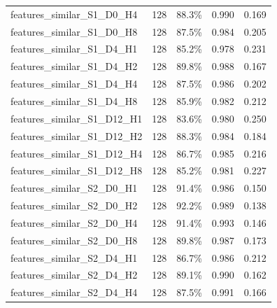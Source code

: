 \documentclass[11pt]{article}
\begin{document}
\begin{longtable}{p{}rrrr}
features\_\allowbreak{}similar\_\allowbreak{}S1\_\allowbreak{}D0\_\allowbreak{}H4 & 128 & 88.3\% & 0.990 & 0.169\\
features\_\allowbreak{}similar\_\allowbreak{}S1\_\allowbreak{}D0\_\allowbreak{}H8 & 128 & 87.5\% & 0.984 & 0.205\\
features\_\allowbreak{}similar\_\allowbreak{}S1\_\allowbreak{}D4\_\allowbreak{}H1 & 128 & 85.2\% & 0.978 & 0.231\\
features\_\allowbreak{}similar\_\allowbreak{}S1\_\allowbreak{}D4\_\allowbreak{}H2 & 128 & 89.8\% & 0.988 & 0.167\\
features\_\allowbreak{}similar\_\allowbreak{}S1\_\allowbreak{}D4\_\allowbreak{}H4 & 128 & 87.5\% & 0.986 & 0.202\\
features\_\allowbreak{}similar\_\allowbreak{}S1\_\allowbreak{}D4\_\allowbreak{}H8 & 128 & 85.9\% & 0.982 & 0.212\\
features\_\allowbreak{}similar\_\allowbreak{}S1\_\allowbreak{}D12\_\allowbreak{}H1 & 128 & 83.6\% & 0.980 & 0.250\\
features\_\allowbreak{}similar\_\allowbreak{}S1\_\allowbreak{}D12\_\allowbreak{}H2 & 128 & 88.3\% & 0.984 & 0.184\\
features\_\allowbreak{}similar\_\allowbreak{}S1\_\allowbreak{}D12\_\allowbreak{}H4 & 128 & 86.7\% & 0.985 & 0.216\\
features\_\allowbreak{}similar\_\allowbreak{}S1\_\allowbreak{}D12\_\allowbreak{}H8 & 128 & 85.2\% & 0.981 & 0.227\\
features\_\allowbreak{}similar\_\allowbreak{}S2\_\allowbreak{}D0\_\allowbreak{}H1 & 128 & 91.4\% & 0.986 & 0.150\\
features\_\allowbreak{}similar\_\allowbreak{}S2\_\allowbreak{}D0\_\allowbreak{}H2 & 128 & 92.2\% & 0.989 & 0.138\\
features\_\allowbreak{}similar\_\allowbreak{}S2\_\allowbreak{}D0\_\allowbreak{}H4 & 128 & 91.4\% & 0.993 & 0.146\\
features\_\allowbreak{}similar\_\allowbreak{}S2\_\allowbreak{}D0\_\allowbreak{}H8 & 128 & 89.8\% & 0.987 & 0.173\\
features\_\allowbreak{}similar\_\allowbreak{}S2\_\allowbreak{}D4\_\allowbreak{}H1 & 128 & 86.7\% & 0.986 & 0.212\\
features\_\allowbreak{}similar\_\allowbreak{}S2\_\allowbreak{}D4\_\allowbreak{}H2 & 128 & 89.1\% & 0.990 & 0.162\\
features\_\allowbreak{}similar\_\allowbreak{}S2\_\allowbreak{}D4\_\allowbreak{}H4 & 128 & 87.5\% & 0.991 & 0.166\\

\end{longtable}
\end{document}
